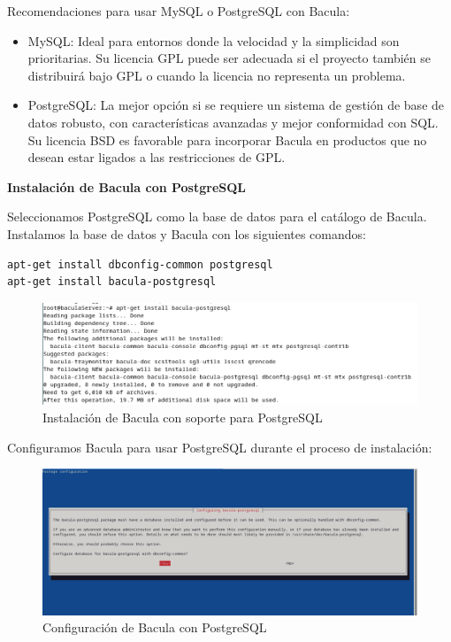 Recomendaciones para usar MySQL o PostgreSQL con Bacula:

\begin{itemize}
    \item MySQL: Ideal para entornos donde la velocidad y la simplicidad son prioritarias. Su licencia GPL puede ser adecuada si el proyecto también se distribuirá bajo GPL o cuando la licencia no representa un problema.
    \item PostgreSQL: La mejor opción si se requiere un sistema de gestión de base de datos robusto, con características avanzadas y mejor conformidad con SQL. Su licencia BSD es favorable para incorporar Bacula en productos que no desean estar ligados a las restricciones de GPL.
\end{itemize}



\textbf{Instalación de Bacula con PostgreSQL}\medskip

Seleccionamos PostgreSQL como la base de datos para el catálogo de Bacula. Instalamos la base de datos y Bacula con los siguientes comandos:
\begin{verbatim}
apt-get install dbconfig-common postgresql
apt-get install bacula-postgresql
\end{verbatim}

\begin{figure}[H]
    \centering
    \includegraphics[width=0.5\linewidth]{instalacionBacula/baculapostgesql.png}
    \caption{Instalación de Bacula con soporte para PostgreSQL}
\end{figure}

Configuramos Bacula para usar PostgreSQL durante el proceso de instalación:

\begin{figure}[H]
    \centering
    \includegraphics[width=0.5\linewidth]{instalacionBacula/configbaculapostgre.png}
    \caption{Configuración de Bacula con PostgreSQL}
\end{figure}

